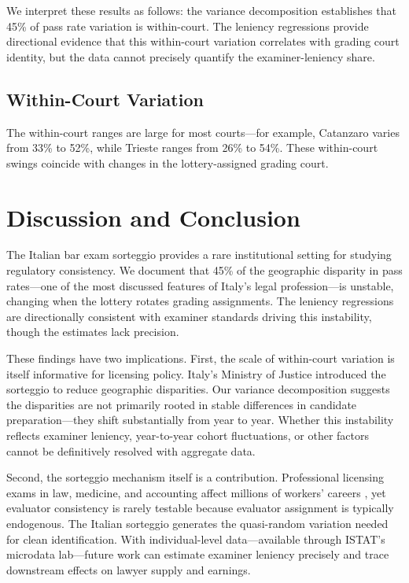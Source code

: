 \documentclass[11pt]{article}
\begin{document}
We interpret these results as follows: the variance decomposition establishes that 45\% of pass rate variation is within-court. The leniency regressions provide directional evidence that this within-court variation correlates with grading court identity, but the data cannot precisely quantify the examiner-leniency share.

{\small}

\subsection{Within-Court Variation}

The within-court ranges are large for most courts---for example, Catanzaro varies from 33\% to 52\%, while Trieste ranges from 26\% to 54\%. These within-court swings coincide with changes in the lottery-assigned grading court.


\section{Discussion and Conclusion} \label{sec:conclusion}

The Italian bar exam sorteggio provides a rare institutional setting for studying regulatory consistency. We document that 45\% of the geographic disparity in pass rates---one of the most discussed features of Italy's legal profession---is unstable, changing when the lottery rotates grading assignments. The leniency regressions are directionally consistent with examiner standards driving this instability, though the estimates lack precision.

These findings have two implications. First, the scale of within-court variation is itself informative for licensing policy. Italy's Ministry of Justice introduced the sorteggio to reduce geographic disparities. Our variance decomposition suggests the disparities are not primarily rooted in stable differences in candidate preparation---they shift substantially from year to year. Whether this instability reflects examiner leniency, year-to-year cohort fluctuations, or other factors cannot be definitively resolved with aggregate data.

Second, the sorteggio mechanism itself is a contribution. Professional licensing exams in law, medicine, and accounting affect millions of workers' careers \citep{kleiner2013}, yet evaluator consistency is rarely testable because evaluator assignment is typically endogenous. The Italian sorteggio generates the quasi-random variation needed for clean identification. With individual-level data---available through ISTAT's microdata lab---future work can estimate examiner leniency precisely and trace downstream effects on lawyer supply and earnings.
\end{document}
